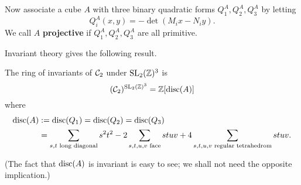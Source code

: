 Now associate a cube $A$ with three binary quadratic forms $Q_1^A,Q_2^A,Q_3^A$ by letting
\[
Q_i^A(x,y)=-\det(M_ix-N_iy).
\]
We call $A$ \textbf{projective} if $Q_1^A,Q_2^A,Q_3^A$ are all primitive.

Invariant theory gives the following result.
\begin{pr}
The ring of invariants of $\cal C_2$ under $\SL_2(\Z)^3$ is
\[
(\cal C_2)^{\SL_2(\Z)^3}=\Z[\disc(A)]
\]
where
\begin{align*}
\disc(A)&:=\disc(Q_1)=\disc(Q_2)=\disc(Q_3)\\
&=\sum_{s,t\text{ long diagonal}} s^2t^2-2\sum_{s,t,u,v\text{ face}}stuv+4\sum_{s,t,u,v \text{ regular tetrahedrom}} stuv.
\end{align*}
\end{pr}
(The fact that $\disc(A)$ is invariant is easy to see; we shall not need the opposite implication.)

